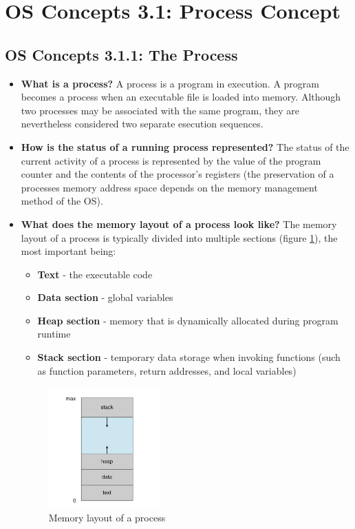 \documentclass[12pt]{article}
\begin{document}
\section*{OS Concepts 3.1: Process Concept}

\subsection*{OS Concepts 3.1.1: The Process}

\begin{itemize}
    \item \textbf{What is a process?} A process is a program in execution. A program becomes a process when an executable file is loaded into memory. Although two processes may be associated with the same program, they are nevertheless considered two separate esecution sequences.
    \item \textbf{How is the status of a running process represented?} The status of the current activity of a process is represented by the value of the program counter and the contents of the processor's registers (the preservation of a processes memory address space depends on the memory management method of the OS).
    \item \textbf{What does the memory layout of a process look like?} The memory layout of a process is typically divided into multiple sections (figure \ref{fig:process-memory-layout}), the most important being:
        \begin{itemize}
            \item \textbf{Text} - the executable code
            \item \textbf{Data section} - global variables
            \item \textbf{Heap section} - memory that is dynamically allocated during program runtime
            \item \textbf{Stack section} - temporary data storage when invoking functions (such as function parameters, return addresses, and local variables)
        \end{itemize}
        \begin{figure}[ht]
            \centering
            \includegraphics[width=0.4\textwidth]{figures/process-memory-layout.jpg}
            \caption{Memory layout of a process}
            \label{fig:process-memory-layout}
        \end{figure}
\end{itemize}
\end{document}
